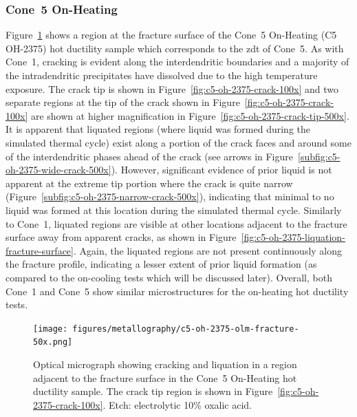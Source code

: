 {\subsubsection{Cone~5 On-Heating}
Figure~\ref{fig:c5-oh-2375-olm-fracture} shows a region at the fracture surface of the Cone~5 On-Heating  (C5 OH-2375) hot ductility sample which corresponds to the \gls{zdt} of Cone~5. As with Cone~1, cracking is evident along the interdendritic boundaries and a majority of the intradendritic precipitates have dissolved due to the high temperature exposure. The crack tip is shown in Figure~\ref{fig:c5-oh-2375-crack-100x} and two separate regions at the tip of the crack shown in Figure~\ref{fig:c5-oh-2375-crack-100x} are shown at higher magnification in Figure~\ref{fig:c5-oh-2375-crack-tip-500x}. It is apparent that liquated regions (where liquid was formed during the simulated thermal cycle) exist along a portion of the crack faces and around some of the interdendritic phases ahead of the crack (see arrows in Figure~\ref{subfig:c5-oh-2375-wide-crack-500x}). However, significant evidence of prior liquid is not apparent at the extreme tip portion where the crack is quite narrow (Figure~\ref{subfig:c5-oh-2375-narrow-crack-500x}), indicating that minimal to no liquid was formed at this location during the simulated thermal cycle. Similarly to Cone~1, liquated regions are visible at other locations adjacent to the fracture surface away from apparent cracks, as shown in Figure~\ref{fig:c5-oh-2375-liquation-fracture-surface}. Again, the liquated regions are not present continuously along the fracture profile, indicating a lesser extent of prior liquid formation (as compared to the on-cooling tests which will be discussed later). Overall, both Cone~1 and Cone~5 show similar microstructures for the on-heating hot ductility tests.


\begin{figure}
    \centering
    \texttt{[image: figures/metallography/c5-oh-2375-olm-fracture-50x.png]}
    \caption[Optical micrograph showing cracking and liquation in a region adjacent to the fracture surface in the Cone~5 On-Heating \protect{} hot ductility sample.]{Optical micrograph showing cracking and liquation in a region adjacent to the fracture surface in the Cone~5 On-Heating \protect{} hot ductility sample. The crack tip region is shown in Figure~\ref{fig:c5-oh-2375-crack-100x}. Etch: electrolytic 10\% oxalic acid.}
    \label{fig:c5-oh-2375-olm-fracture}
\end{figure}

}
